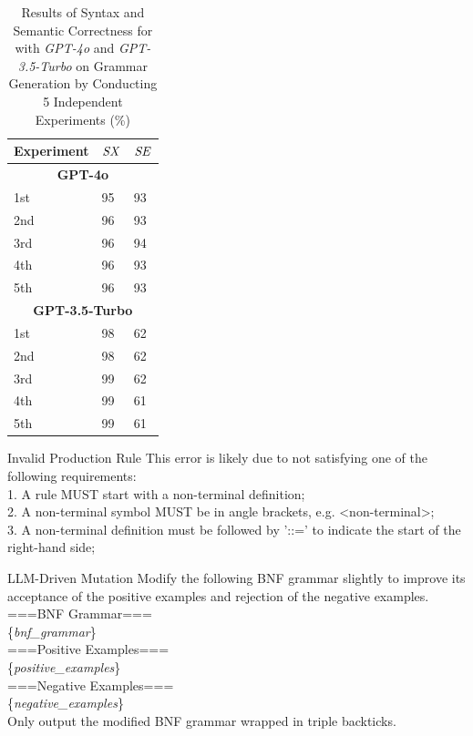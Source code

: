 

\begin{table}
\centering
\begin{tabularx}{\linewidth}{X X X}
\toprule
\textbf{Experiment} & \textbf{$\mathit{SX}$} & \textbf{$\mathit{SE}$} \\
\midrule
\multicolumn{3}{c}{\small\textbf{GPT-4o}} \\
\midrule
1st & 95 & 93 \\
2nd & 96 & 93 \\
3rd & 96 & 94 \\
4th & 96 & 93 \\
5th & 96 & 93 \\
\midrule
\multicolumn{3}{c}{\small\textbf{GPT-3.5-Turbo}} \\
\midrule
1st & 98 & 62 \\
2nd & 98 & 62 \\
3rd & 99 & 62 \\
4th & 99 & 61 \\
5th & 99 & 61 \\
\bottomrule
\end{tabularx}
\caption{Results of Syntax and Semantic Correctness for \NAME with \textit{GPT-4o} and \textit{GPT-3.5-Turbo} on Grammar Generation by Conducting 5 Independent Experiments (\%)}
\label{tab:5_times}
\end{table}


\begin{feedbackblock}{Invalid Production Rule}
\label{feedback:invalid_rule}
This error is likely due to not satisfying one of the following requirements:\\
1. A rule MUST start with a non-terminal definition;\\
2. A non-terminal symbol MUST be in angle brackets, e.g. <non-terminal>;\\
3. A non-terminal definition must be followed by '::=' to indicate the start of the right-hand side;\\
\end{feedbackblock}

\begin{promptblock}{LLM-Driven Mutation}
\label{prompt:llm_driven_mutation}
Modify the following BNF grammar slightly to improve its acceptance of the positive examples and rejection of the negative examples.\\
\vspace{\baselineskip}
===BNF Grammar===\\
\{\textit{bnf\_grammar}\}\\
\vspace{\baselineskip}
===Positive Examples===\\
\{\textit{positive\_examples}\}\\
===Negative Examples===\\
\{\textit{negative\_examples}\}\\
\vspace{\baselineskip}
Only output the modified BNF grammar wrapped in triple backticks.
\end{promptblock}


